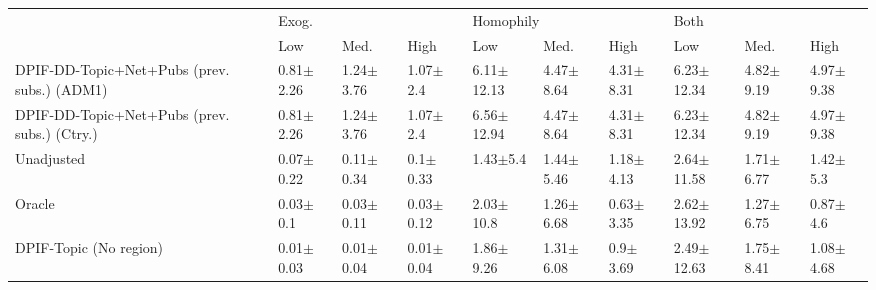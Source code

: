 \begin{tabular}{llllllllll}
\toprule
{} & \multicolumn{3}{l}{Exog.} & \multicolumn{3}{l}{Homophily} & \multicolumn{3}{l}{Both} \\
{} &            Low &           Med. &           High &             Low &           Med. &           High &             Low &           Med. &           High \\
\midrule
DPIF-DD-Topic+Net+Pubs (prev. subs.) (ADM1)  &  0.81$\pm$2.26 &  1.24$\pm$3.76 &   1.07$\pm$2.4 &  6.11$\pm$12.13 &  4.47$\pm$8.64 &  4.31$\pm$8.31 &  6.23$\pm$12.34 &  4.82$\pm$9.19 &  4.97$\pm$9.38 \\
DPIF-DD-Topic+Net+Pubs (prev. subs.) (Ctry.) &  0.81$\pm$2.26 &  1.24$\pm$3.76 &   1.07$\pm$2.4 &  6.56$\pm$12.94 &  4.47$\pm$8.64 &  4.31$\pm$8.31 &  6.23$\pm$12.34 &  4.82$\pm$9.19 &  4.97$\pm$9.38 \\
Unadjusted                                   &  0.07$\pm$0.22 &  0.11$\pm$0.34 &   0.1$\pm$0.33 &    1.43$\pm$5.4 &  1.44$\pm$5.46 &  1.18$\pm$4.13 &  2.64$\pm$11.58 &  1.71$\pm$6.77 &   1.42$\pm$5.3 \\
Oracle                                       &   0.03$\pm$0.1 &  0.03$\pm$0.11 &  0.03$\pm$0.12 &   2.03$\pm$10.8 &  1.26$\pm$6.68 &  0.63$\pm$3.35 &  2.62$\pm$13.92 &  1.27$\pm$6.75 &   0.87$\pm$4.6 \\
DPIF-Topic (No region)                       &  0.01$\pm$0.03 &  0.01$\pm$0.04 &  0.01$\pm$0.04 &   1.86$\pm$9.26 &  1.31$\pm$6.08 &   0.9$\pm$3.69 &  2.49$\pm$12.63 &  1.75$\pm$8.41 &  1.08$\pm$4.68 \\
\bottomrule
\end{tabular}
